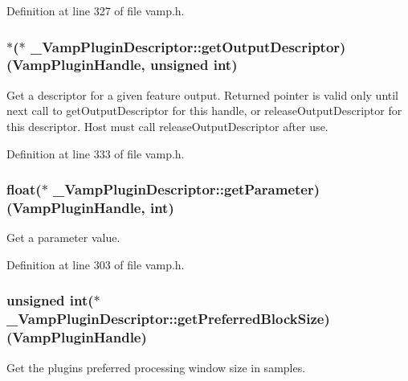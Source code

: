 Definition at line 327 of file vamp.\+h.

\subsubsection[{\texorpdfstring{get\+Output\+Descriptor}{getOutputDescriptor}}]{$\ast$($\ast$ \+\_\+\+Vamp\+Plugin\+Descriptor\+::get\+Output\+Descriptor) ({\bf Vamp\+Plugin\+Handle}, unsigned {\bf int})}\hypertarget{struct___vamp_plugin_descriptor_a033116c818aafe70e7fd15d240234754}{}\label{struct___vamp_plugin_descriptor_a033116c818aafe70e7fd15d240234754}
Get a descriptor for a given feature output. Returned pointer is valid only until next call to get\+Output\+Descriptor for this handle, or release\+Output\+Descriptor for this descriptor. Host must call release\+Output\+Descriptor after use. 

Definition at line 333 of file vamp.\+h.

\subsubsection[{\texorpdfstring{get\+Parameter}{getParameter}}]{\setlength{\rightskip}{0pt plus 5cm}float($\ast$ \+\_\+\+Vamp\+Plugin\+Descriptor\+::get\+Parameter) ({\bf Vamp\+Plugin\+Handle}, {\bf int})}\hypertarget{struct___vamp_plugin_descriptor_a153dc1fa458602a408d8ae909e4b9780}{}\label{struct___vamp_plugin_descriptor_a153dc1fa458602a408d8ae909e4b9780}
Get a parameter value. 

Definition at line 303 of file vamp.\+h.

\subsubsection[{\texorpdfstring{get\+Preferred\+Block\+Size}{getPreferredBlockSize}}]{\setlength{\rightskip}{0pt plus 5cm}unsigned {\bf int}($\ast$ \+\_\+\+Vamp\+Plugin\+Descriptor\+::get\+Preferred\+Block\+Size) ({\bf Vamp\+Plugin\+Handle})}\hypertarget{struct___vamp_plugin_descriptor_a3052e7f14ad1dfc3000b3b91dddf8c61}{}\label{struct___vamp_plugin_descriptor_a3052e7f14ad1dfc3000b3b91dddf8c61}
Get the plugin\textquotesingle{}s preferred processing window size in samples. 

